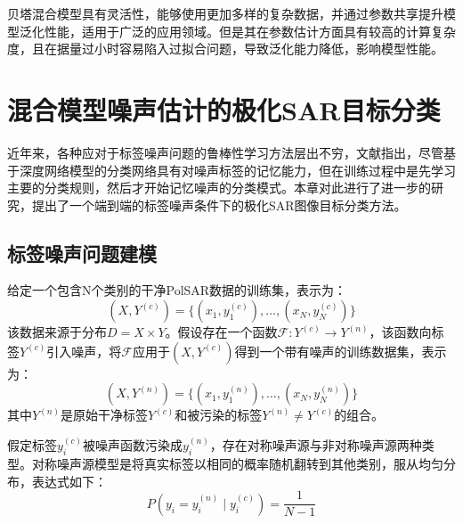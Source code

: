 贝塔混合模型具有灵活性，能够使用更加多样的复杂数据，并通过参数共享提升模型泛化性能，适用于广泛的应用领域。但是其在参数估计方面具有较高的计算复杂度，且在据量过小时容易陷入过拟合问题，导致泛化能力降低，影响模型性能。

\section{混合模型噪声估计的极化SAR目标分类}
近年来，各种应对于标签噪声问题的鲁棒性学习方法层出不穷，文献\cite{zhang2021understanding,zhang2018generalized}指出，尽管基于深度网络模型的分类网络具有对噪声标签的记忆能力，但在训练过程中是先学习主要的分类规则，然后才开始记忆噪声的分类模式。本章对此进行了进一步的研究，提出了一个端到端的标签噪声条件下的极化SAR图像目标分类方法。

\subsection{标签噪声问题建模}
给定一个包含N个类别的干净PolSAR数据的训练集，表示为：
\begin{equation}
    (X, Y^{(c)})=\{(x_1,y_1^{(c)}),\ldots,(x_N,y_N^{(c)})\}
\end{equation}
该数据来源于分布$D=X \times Y$。假设存在一个函数$\mathcal{F}:Y^{(c)} \rightarrow Y^{(n)}$，该函数向标签$Y^{(c)}$引入噪声，将$\mathcal{F}$应用于$(X, Y^{(c)})$得到一个带有噪声的训练数据集，表示为：
\begin{equation}
    (X, Y^{(n)})=\{(x_1,y_1^{(n)}),\ldots,(x_N,y_N^{(n)})\}
\end{equation}
其中$Y^{(n)}$是原始干净标签$Y^{(c)}$和被污染的标签$Y^{(n)} \neq Y^{(c)}$的组合。

假定标签$y_i^{(c)}$被噪声函数污染成$y_i^{(n)}$，存在对称噪声源与非对称噪声源两种类型。对称噪声源模型是将真实标签以相同的概率随机翻转到其他类别，服从均匀分布，表达式如下：
\begin{equation}
    P(y_i=y_i^{(n)} \mid y_i^{(c)})=\frac{1}{N-1}
\end{equation}

